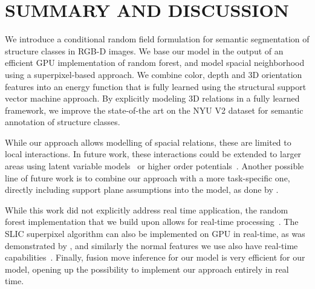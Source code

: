 \documentclass[a4paper, 10pt, conference]{ieeeconf}      %
\begin{document}
\section{SUMMARY AND DISCUSSION}
We introduce a conditional random field formulation for semantic segmentation
of structure classes in RGB-D images. We base our model in the output of an efficient GPU implementation
of random forest, and model spacial neighborhood using a superpixel-based approach.
We combine color, depth and 3D orientation features into an energy function that is fully learned using 
 the structural support vector machine approach.  By explicitly modeling 3D
 relations in a fully learned framework, we improve the state-of-the art on the
 NYU V2 dataset for semantic annotation of structure classes.


While our approach allows modelling of spacial relations, these are limited to
local interactions. In future work, these interactions could be extended to
larger areas using latent variable models~\citep{dann2012pottics} or higher
order potentials~\citep{kohli2009robust}.
Another possible line of future work is to combine our approach with a more
task-specific one, directly including support plane assumptions into the model, as done by
\citet{SilbermanECCV12}.

While this work did not explicitly address real time application, the random
forest implementation that we build upon allows for real-time
processing~\citep{stueckler2013}. The SLIC superpixel algorithm can also be
implemented on GPU in real-time, as was demonstrated by \citep{ren2011gslic}, and similarly
the normal features we use also have
real-time capabilities~\citep{holz_2011_robocup}.
Finally, fusion move inference for our model is very efficient for our model,
opening up the possibility to implement our approach entirely in real time.

\printbibliography{}
\end{document}
